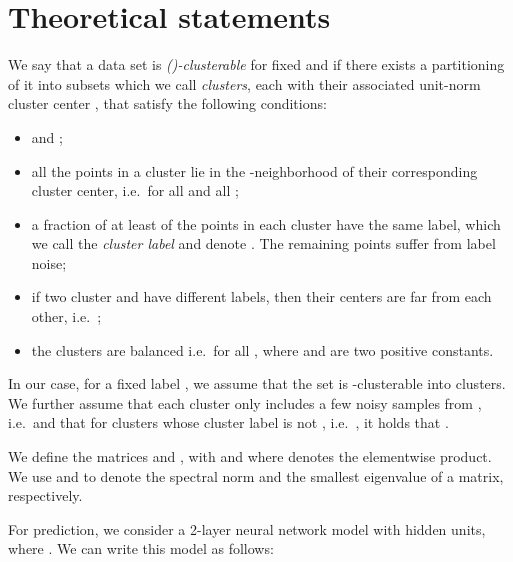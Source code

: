 \section{Theoretical statements}
\label{sec:appendix_theory}

\begin{definition}

  We say that a data set  is \emph{()-clusterable} for fixed  and  if there exists
  a partitioning of it into subsets  which we call
  \emph{clusters}, each with their associated unit-norm cluster center ,
  that satisfy the following conditions:



  \begin{itemize}[leftmargin=*]

    \item  and ; 

    \item all the points in a cluster lie in the -neighborhood of their
      corresponding cluster center, i.e.\  for all  and all ;

    \item a fraction of at least  of the points in each cluster 
      have the same label, which we call the \emph{cluster label} and denote
      . The remaining points suffer from label noise;

    \item if two cluster  and  have different labels, then their
      centers are  far from each other, i.e.\ ;

    \item the clusters are balanced i.e.\ for all , where  and
       are two positive constants.

  \end{itemize}

\end{definition}

In our case, for a fixed label , we assume that the set
 is -clusterable into 
clusters. We further assume that each cluster  only includes a few noisy
samples from , i.e.\  and that for clusters  whose
cluster label is not , i.e.\ , it
holds that . 

We define the matrices  and
, with  and where  denotes the elementwise product. We use 
and  to denote the spectral norm and the smallest
eigenvalue of a matrix, respectively.

For prediction, we consider a 2-layer neural network model with  hidden
units, where . We can
write this model as follows:



